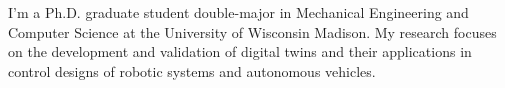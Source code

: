 

\begin{cvparagraph}

I'm a Ph.D. graduate student double-major in Mechanical Engineering and Computer Science at the University of Wisconsin Madison. My research focuses on the development and validation of digital twins and their applications in control designs of robotic systems and autonomous vehicles.
\end{cvparagraph}
